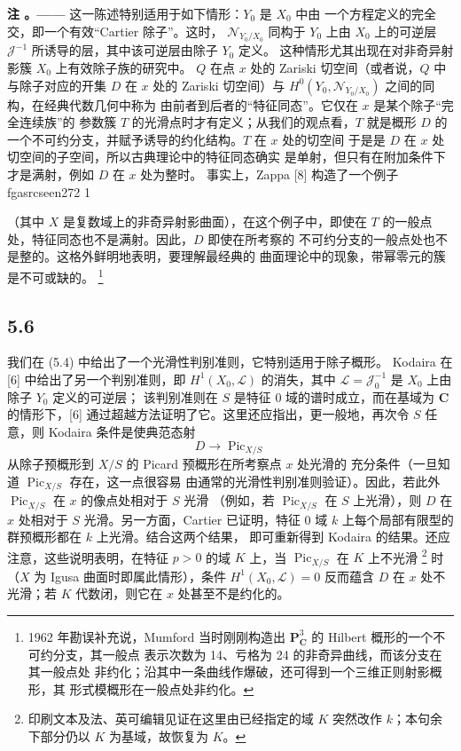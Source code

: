 \documentclass[12pt,twoside,openany]{book}
\numberwithin{equation}{section}
\newcommand{\fgaunitid}{unbound}
\newcommand{\src}[1]{%
  \phantomsection
  \hypertarget{src:\fgaunitid:#1}{}%
  \hypertarget{fga.\fgaunitid.p#1}{}%
  \ifcsname fgasrcseen#1\endcsname\else
    \expandafter\gdef\csname fgasrcseen#1\endcsname{1}%
    \hypertarget{src:#1}{}%
  \fi
  \marginpar{\raggedleft\footnotesize\sffamily #1}%
}
\theoremstyle{plain}
\theoremstyle{definition}
\theoremstyle{remark}
\newcommand{\result}[2]{%
  \par\medskip\noindent\textbf{#1%
  \if\relax\detokenize{#2}\relax\else\space#2\fi。——}\enspace
}
\begin{document}
\result{注}{5.5} 这一陈述特别适用于如下情形：$Y_0$ 是 $X_0$ 中由
一个方程定义的完全交，即一个有效“Cartier 除子”。这时，
$\mathcal N_{Y_0/X_0}$ 同构于 $Y_0$ 上由 $X_0$ 上的可逆层
$\mathcal J^{-1}$ 所诱导的层，其中该可逆层由除子 $Y_0$ 定义。
这种情形尤其出现在对非奇异射影簇 $X_0$ 上有效除子族的研究中。
$Q$ 在点 $x$ 处的 Zariski 切空间（或者说，$Q$ 中与除子对应的开集
$D$ 在 $x$ 处的 Zariski 切空间）与
$H^0(Y_0,\mathcal N_{Y_0/X_0})$ 之间的同构，在经典代数几何中称为
由前者到后者的“特征同态”。它仅在 $x$ 是某个除子“完全连续族”的
参数簇 $T$ 的光滑点时才有定义；从我们的观点看，$T$ 就是概形
$D$ 的一个不可约分支，并赋予诱导的约化结构。$T$ 在 $x$ 处的切空间
于是是 $D$ 在 $x$ 处切空间的子空间，所以古典理论中的特征同态确实
是单射，但只有在附加条件下才是满射，例如 $D$ 在 $x$ 处为整时。
事实上，Zappa [8] 构造了一个例子
\src{272}
（其中 $X$ 是复数域上的非奇异射影曲面），在这个例子中，即使在
$T$ 的一般点处，特征同态也不是满射。因此，$D$ 即使在所考察的
不可约分支的一般点处也不是整的。这格外鲜明地表明，要理解最经典的
曲面理论中的现象，带幂零元的簇是不可或缺的。
\footnote{1962 年勘误补充说，Mumford 当时刚刚构造出
$\mathbf P^3_{\mathbf C}$ 的 Hilbert 概形的一个不可约分支，其一般点
表示次数为 14、亏格为 24 的非奇异曲线，而该分支在其一般点处
非约化；沿其中一条曲线作爆破，还可得到一个三维正则射影概形，其
形式模概形在一般点处非约化。}

\subsection*{5.6}

我们在 (5.4) 中给出了一个光滑性判别准则，它特别适用于除子概形。
Kodaira 在 [6] 中给出了另一个判别准则，即
$H^1(X_0,\mathcal L)$ 的消失，其中
$\mathcal L=\mathcal J_0^{-1}$ 是 $X_0$ 上由除子 $Y_0$ 定义的可逆层；
该判别准则在 $S$ 是特征 0 域的谱时成立，而在基域为 $\mathbf C$
的情形下，[6] 通过超越方法证明了它。这里还应指出，更一般地，再次令
$S$ 任意，则 Kodaira 条件是使典范态射
\[
D\longrightarrow\operatorname{Pic}_{X/S}
\]
从除子预概形到 $X/S$ 的 Picard 预概形在所考察点 $x$ 处光滑的
充分条件（一旦知道 $\operatorname{Pic}_{X/S}$ 存在，这一点很容易
由通常的光滑性判别准则验证）。因此，若此外
$\operatorname{Pic}_{X/S}$ 在 $x$ 的像点处相对于 $S$ 光滑
（例如，若 $\operatorname{Pic}_{X/S}$ 在 $S$ 上光滑），则 $D$
在 $x$ 处相对于 $S$ 光滑。另一方面，Cartier 已证明，特征 0 域
$k$ 上每个局部有限型的群预概形都在 $k$ 上光滑。结合这两个结果，
即可重新得到 Kodaira 的结果。还应注意，这些说明表明，在特征
$p>0$ 的域 $K$ 上，当 $\operatorname{Pic}_{X/S}$ 在 $K$ 上不光滑
\footnote{印刷文本及法、英可编辑见证在这里由已经指定的域 $K$
突然改作 $k$；本句余下部分仍以 $K$ 为基域，故恢复为 $K$。}
时（$X$ 为 Igusa 曲面时即属此情形），条件
$H^1(X_0,\mathcal L)=0$ 反而蕴含 $D$ 在 $x$ 处不光滑；若 $K$
代数闭，则它在 $x$ 处甚至不是约化的。
\end{document}
